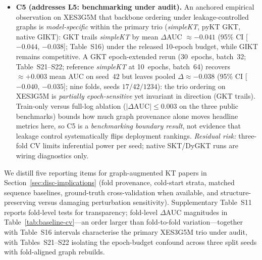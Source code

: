 \documentclass[pdflatex,sn-mathphys-num]{sn-jnl}
\newcommand{\GKTdeltaci}{[$-0.044$, $-0.038$]}
\newcommand{\GKTthirtydeltavec}{-0.038}
\newcommand{\GKTthirtydeltaci}{[$-0.040$, $-0.035$]}
\newcommand{\GKTepochgain}{+0.003}
\begin{document}
\begin{itemize}
  expert threshold ($\theta{=}0.5$).
  \item \textbf{C5 (addresses L5: benchmarking under audit).} An anchored
  empirical observation on XES3G5M that backbone ordering under
  leakage-controlled graphs is \emph{model-specific} within the primary trio
  (\textit{simpleKT}, pyKT GKT, native GIKT): GKT trails \textit{simpleKT} by
  mean $\Delta$AUC ${\approx}{-}0.041$ (95\% CI \GKTdeltaci{}; Table~S16) under
  the released 10-epoch budget, while GIKT remains competitive. A
  GKT epoch-extended rerun (30~epochs, batch~32; Table~S21--S22; reference
  \textit{simpleKT} at 10~epochs, batch~64) recovers
  ${\approx}\GKTepochgain{}$ mean AUC on seed~$42$ but leaves pooled
  $\Delta{\approx}\GKTthirtydeltavec{}$ (95\% CI \GKTthirtydeltaci{};
  nine folds, seeds $17/42/1234$): the trio ordering on XES3G5M is
  \emph{partially epoch-sensitive} yet invariant in direction (GKT trails).
  Train-only versus full-log
  ablation ($|\Delta\text{AUC}|{\leq}0.003$ on the three public benchmarks)
  bounds how much graph provenance alone moves headline metrics here, so C5 is
  a \emph{benchmarking boundary result}, not evidence that leakage control
  systematically flips deployment rankings.
  \emph{Residual risk:} three-fold CV limits inferential power per seed; native
  SKT/DyGKT runs are wiring diagnostics only.
\end{itemize}

We distill five reporting items for graph-augmented KT papers in
Section~\ref{sec:disc-implications} (fold provenance, cold-start strata,
matched sequence baselines, ground-truth cross-validation when available, and
structure-preserving versus damaging perturbation sensitivity).
Supplementary Table~S11 reports fold-level tests for transparency; fold-level
$\Delta$AUC magnitudes in Table~\ref{tab:baseline-cv}---an order larger than
fold-to-fold variation---together with Table~S16 intervals characterise the
primary XES3G5M trio under audit, with Tables~S21--S22 isolating the epoch-budget
confound across three split seeds with fold-aligned graph rebuilds.
\end{document}
